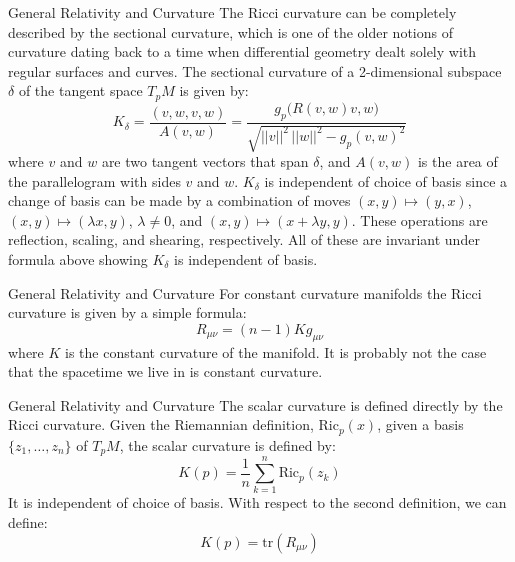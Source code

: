 \documentclass{beamer}
\begin{document}
    \begin{frame}{General Relativity and Curvature}
        The Ricci curvature can be completely described by the sectional
        curvature, which is one of the older notions of curvature dating back
        to a time when differential geometry dealt solely with regular surfaces
        and curves. The sectional curvature of a 2-dimensional subspace
        $\delta$ of the tangent space $T_{p}M$ is given by:
        \begin{equation}
            K_{\delta}=\frac{(v,w,v,w)}{A(v,w)}
                =\frac{g_{p}\big(R(v,w)v,w\big)}
                      {\sqrt{||v||^{2}\,||w||^{2}-g_{p}(v,w)^{2}}}
        \end{equation}
        where $v$ and $w$ are two tangent vectors that span $\delta$, and
        $A(v,w)$ is the area of the parallelogram with sides $v$ and $w$.
        $K_{\delta}$ is independent of choice of basis since a change of basis
        can be made by a combination of moves
        $(x,y)\mapsto(y,x)$, $(x,y)\mapsto(\lambda{x},y)$, $\lambda\ne{0}$, and
        $(x,y)\mapsto(x+\lambda{y},y)$. These operations are reflection,
        scaling, and shearing, respectively. All of these are invariant under
        formula above showing $K_{\delta}$ is independent of basis.
    \end{frame}
    \begin{frame}{General Relativity and Curvature}
        For constant curvature manifolds the Ricci curvature is given by a
        simple formula:
        \begin{equation}
            R_{\mu\nu}=(n-1)Kg_{\mu\nu}
        \end{equation}
        where $K$ is the constant curvature of the manifold.
        It is probably not the case that the spacetime we live in is constant
        curvature.
    \end{frame}
    \begin{frame}{General Relativity and Curvature}
        The scalar curvature is defined directly by the Ricci curvature. Given
        the Riemannian definition, $\textrm{Ric}_{p}(x)$, given a basis
        $\{z_{1},\dots,z_{n}\}$ of $T_{p}M$, the scalar curvature is defined by:
        \begin{equation}
            K(p)=\frac{1}{n}\sum_{k=1}^{n}\textrm{Ric}_{p}(z_{k})
        \end{equation}
        It is independent of choice of basis. With respect to the second
        definition, we can define:
        \begin{equation}
            K(p)=\textrm{tr}(R_{\mu\nu})
        \end{equation}
    \end{frame}
\end{document}
